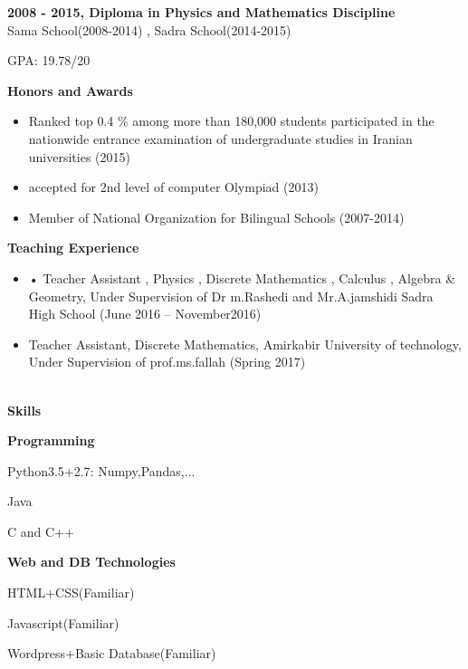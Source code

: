 \documentclass[a4paper,12pt,final]{memoir}
\newcommand{\Sep}{\vspace{1.5em}}
\newcommand{\SmallSep}{\vspace{0.5em}}
\newcommand{\CVSection}[1]
	{\Large\textbf{#1}\par
	\SmallSep\normalsize\normalfont}
\newcommand{\CVItem}[1]
	{\textbf{\color{RoyalBlue} #1}}
\begin{document}
\CVItem{2008 - 2015, Diploma in Physics and Mathematics Discipline}\\
Sama School(2008-2014) , Sadra School(2014-2015)

GPA: 19.78/20
\Sep

\CVSection{Honors and Awards}
\begin{itemize}
	\item Ranked top 0.4 \% among more than 180,000 students participated
in the nationwide entrance examination of undergraduate studies
in Iranian universities (2015) 

	\item accepted for 2nd level of computer Olympiad (2013)
	\item Member of National Organization for Bilingual Schools (2007-2014)
 
\end{itemize}

\Sep



\CVSection{Teaching Experience}
	\begin{itemize}
		\item  •	Teacher Assistant , Physics , Discrete Mathematics , Calculus ,  Algebra & Geometry, Under Supervision of Dr m.Rashedi and Mr.A.jamshidi
		Sadra High School (June 2016 – November2016)
	\item  Teacher Assistant, Discrete Mathematics, Amirkabir University of technology, Under Supervision of prof.ms.fallah (Spring 2017)
	\end{itemize}
\Sep

\newpage
\normalsize\normalfont
\framebreak
\framebreak
\\

\CVSection{Skills}
\CVItem{Programming}
\begin{multicols}{3}
\begin{compactitem}[\color{RoyalBlue}$\circ$]
	\item Python3.5+2.7:
	Numpy,Pandas,...
	\item Java
	\item C and C++

	
\end{compactitem}
\end{multicols}
\SmallSep
\CVItem{Web and DB Technologies}

\begin{multicols}{3}
\begin{compactitem}[\color{RoyalBlue}$\circ$]
	\item HTML+CSS(Familiar)
	\item Javascript(Familiar)
	\item Wordpress+Basic Database(Familiar)
\end{compactitem}
\end{multicols}
\SmallSep
\end{document}
